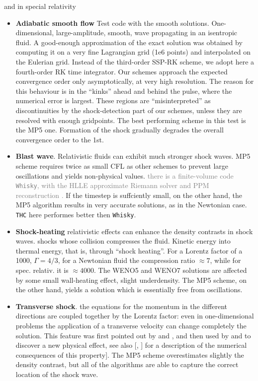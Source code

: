 \documentclass[11pt,a4paper,headinclude=true,DIV=14,BCOR=8mm,chapterprefix,listof=totoc,twoside,openright,abstracton]{scrbook}
\begin{document}
and in special relativity 

\begin{itemize}
    \item \textbf{Adiabatic smooth flow} Test code with the smooth solutions. One-dimensional, large-amplitude, smooth, wave propagating in an isentropic fluid. A good-enough approximation of the exact solution was obtained by computing it on a very fine Lagrangian grid (1e6 points) and interpolated on the Eulerian grid. Instead of the third-order SSP-RK scheme, we adopt here a fourth-order RK time integrator. Our schemes approach the expected convergence order only asymptotically, at very high resolution. The reason for this
    behaviour is in the “kinks” ahead and behind the pulse, where the numerical error is largest. These regions are “misinterpreted” as discontinuities by the shock-detection part of our schemes, unless they are resolved with enough gridpoints. The best performing scheme in this test is the MP5 one. Formation of the shock gradually degrades the overall convergence order to the 1st.
    \item \textbf{Blast wave}. Relativistic fluids can exhibit much stronger shock waves. MP5 scheme requires twice as small CFL as other schemes to prevent large oscillations and yields non-physical values. \textcolor{gray}{there is a finite-volume code \texttt{Whisky}, \cite{Baiotti:2010zf,Baiotti:2004wn} with the HLLE approximate Riemann solver \cite{Toro:1999} and PPM reconstruction \cite{Colella:1984}. } If the timestep is suffciently small, on the other hand, the MP5 algorithm results in very accurate solutions, as in the Newtonian case. \texttt{THC} here performes better then \texttt{Whisky}.
    \item \textbf{Shock-heating} relativistic effects can enhance the density contrasts in shock waves. shocks whose collision compresses the fluid. Kinetic energy into thermal energy, that is, through “shock heating”. For a Lorentz factor of a 1000, $\Gamma=4/3$, for a Newtonian fluid the compression ratio $\approx7$, while for spec. relativ. it is $\approx 4000$. The WENO5 and WENO7 solutions are affected by some small wall-heating effect, slight underdensity. The MP5 scheme, on the other hand, yields a solution which is essentially free
    from oscillations.
    \item \textbf{Transverse shock}. the equations for the momentum in the different directions are coupled together by the Lorentz factor: even in one-dimensional problems the application of a transverse velocity can change completely the solution. This feature was first pointed out by \cite{Pons:2000} and \cite{Rezzolla:2002ra}, and then used by \cite{Rezzolla:2002cc} and \cite{Aloy:2006rd} to discover a new physical effect, see also [\cite{Mignone:2005ns}, \cite{Zhang:2005qy}] for a description of the numerical consequences of this property]. The MP5 scheme overestimates slightly the density contrast, but all of the algorithms are able to capture the correct location of the shock wave.

\end{itemize}
\end{document}
